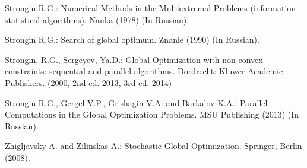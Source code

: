 \documentclass[runningheads]{llncs}
\begin{document}
\begin{thebibliography}{8}
Strongin R.G.: Numerical Methods in the Multiextremal Problems (information-statistical algorithms). Nauka (1978) (In Russian).

Strongin R.G.: Search of global optimum. Znanie (1990) (In Russian).

Strongin, R.G., Sergeyev, Ya.D.: Global Optimization with non-convex constraints: sequential and parallel algorithms. Dordrecht: Kluwer Academic Publishers. (2000, 2nd ed. 2013, 3rd ed. 2014)

Strongin R.G., Gergel V.P., Grishagin V.A. and Barkalov K.A.: Parallel Computations in the Global Optimization Problems. MSU Publishing (2013) (In Russian).

Zhigljavsky A. and \u{Z}ilinskas A.: Stochastic Global Optimization. Springer, Berlin (2008).

\end{thebibliography}
\end{document}
